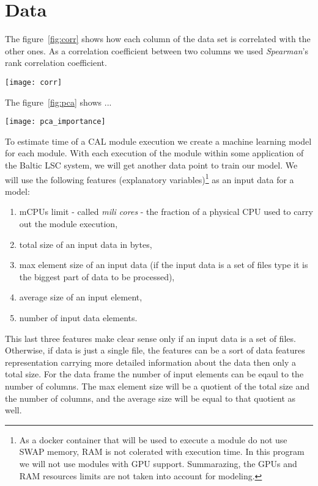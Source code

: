 \section{Data}
The figure~\ref{fig:corr} shows how each column of the data set is correlated with the other ones. As a correlation coefficient between two columns we used \textit{Spearman}'s rank correlation coefficient.

\begin{figure*}[!t]
	\centering
	\begin{minipage}{0.75\linewidth}
		\texttt{[image: corr]}
	\end{minipage}
	\caption{Data columns Spearman`s correlation per module.}
	\label{fig:corr}
\end{figure*}

The figure~\ref{fig:pca} shows ...

\begin{figure*}[!t]
	\centering
	\begin{minipage}{0.75\linewidth}
		\texttt{[image: pca\_importance]}
	\end{minipage}
	\caption{PCA importance per module.}
	\label{fig:pca}
\end{figure*}

To estimate time of a CAL module execution we create a machine learning model for each module. With each execution of the module within some application of the Baltic LSC system, we will get another data point to train our model. We will use the following features (explanatory variables)\footnote{As a docker container that will be used to execute a module do not use SWAP memory, RAM is not colerated with execution time. In this program we will not use modules with GPU support. Summarazing, the GPUs and RAM resources limits are not taken into account for modeling.} as an input data for a model:
\begin{enumerate}
	\item mCPUs limit - called \textit{mili cores} - the fraction of a physical CPU used to carry out the module execution,
	\item total size of an input data in bytes,
	\item max element size of an input data (if the input data is a set of files type it is the biggest part of data to be processed),
	\item average size of an input element,
	\item number of input data elements.
\end{enumerate}
This last three features make clear sense only if an input data is a set of files. Otherwise, if data is just a single file, the features can be a sort of data features representation carrying more detailed information about the data then only a total size. For the data frame the number of input elements can be eqaul to the number of columns. The max element size will be a quotient of the total size and the number of columns, and the average size will be equal to that quotient as well.

